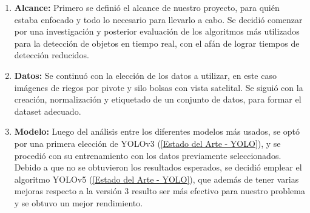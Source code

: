 \begin{enumerate}
    \item \textbf{Alcance:} Primero se definió el alcance de nuestro proyecto, para quién estaba enfocado y todo lo necesario para llevarlo a cabo. Se decidió comenzar por una investigación y posterior evaluación de los algoritmos más utilizados para la detección de objetos en tiempo real, con el afán de lograr tiempos de detección reducidos.
    \item \textbf{Datos:} Se continuó con la elección de los datos a utilizar, en este caso imágenes de riegos por pivote y silo bolsas con vista satelital. Se siguió con la creación, normalización y etiquetado de un conjunto de datos, para formar el dataset adecuado.
    \item \textbf{Modelo:} Luego del análisis entre los diferentes modelos más usados, se optó por una primera elección de YOLOv3 (\ref{Estado del Arte - YOLO}), y se procedió con su entrenamiento con los datos previamente seleccionados. Debido a que no se obtuvieron los resultados esperados, se decidió emplear el algoritmo YOLOv5 (\ref{Estado del Arte - YOLO}), que además de tener varias mejoras respecto a la versión 3 resulto ser más efectivo para nuestro problema y se obtuvo un mejor rendimiento.
    

\end{enumerate}
